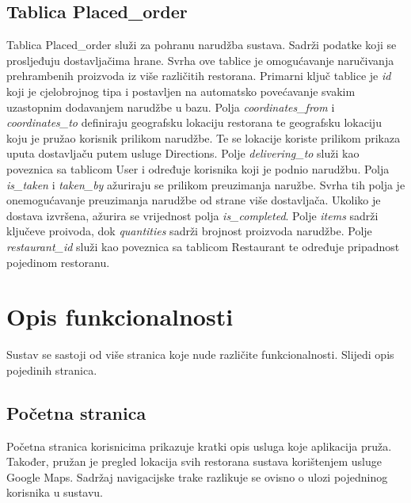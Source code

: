 \documentclass[times, utf8, zavrsni, numeric]{fer}
\begin{document}
\subsection{Tablica Placed\_order}
Tablica Placed\_order služi za pohranu narudžba sustava. Sadrži podatke koji se prosljeđuju dostavljačima hrane. Svrha ove tablice je omogućavanje naručivanja prehrambenih proizvoda iz više različitih restorana.  Primarni ključ tablice je \emph{id} koji je cjelobrojnog tipa i postavljen na automatsko povećavanje svakim uzastopnim dodavanjem narudžbe u bazu. Polja \emph{coordinates\_from} i \emph{coordinates\_to} definiraju geografsku lokaciju restorana te geografsku lokaciju koju je pružao korisnik prilikom narudžbe. Te se lokacije koriste prilikom prikaza uputa dostavljaču putem usluge Directions. Polje \emph{delivering\_to} služi kao poveznica sa tablicom User i određuje korisnika koji je podnio narudžbu. Polja \emph{is\_taken} i \emph{taken\_by} ažuriraju se prilikom preuzimanja naružbe. Svrha tih polja je onemogućavanje preuzimanja narudžbe od strane više dostavljača. Ukoliko je dostava izvršena, ažurira se vrijednost polja \emph{is\_completed}. Polje \emph{items} sadrži ključeve proivoda, dok \emph{quantities} sadrži brojnost proizvoda narudžbe. Polje \emph{restaurant\_id} služi kao poveznica sa tablicom Restaurant te određuje pripadnost pojedinom restoranu.
\section{Opis funkcionalnosti}
Sustav se sastoji od više stranica koje nude različite funkcionalnosti. Slijedi opis pojedinih stranica.
\subsection{Početna stranica}
Početna stranica korisnicima prikazuje kratki opis usluga koje aplikacija pruža. Također, pružan je pregled lokacija svih restorana sustava korištenjem usluge Google Maps. Sadržaj navigacijske trake razlikuje se ovisno o ulozi pojedninog korisnika u sustavu.
\end{document}

